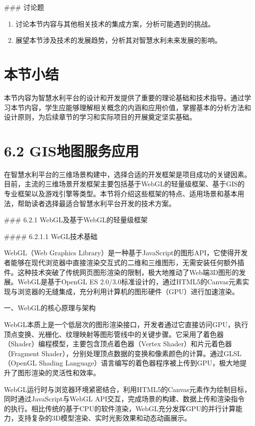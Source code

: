 \#\#\# 讨论题

\begin{enumerate}
\def\labelenumi{\arabic{enumi}.}
\setcounter{enumi}{6}
\tightlist
\item
  讨论本节内容与其他相关技术的集成方案，分析可能遇到的挑战。
\item
  展望本节涉及技术的发展趋势，分析其对智慧水利未来发展的影响。
\end{enumerate}

\section{本节小结}

本节内容为智慧水利平台的设计和开发提供了重要的理论基础和技术指导。通过学习本节内容，学生应能够理解相关概念的内涵和应用价值，掌握基本的分析方法和设计原则，为后续章节的学习和实际项目的开展奠定坚实基础。

\section{6.2 GIS地图服务应用}

在智慧水利平台的三维场景构建中，选择合适的开发框架是项目成功的关键因素。目前，主流的三维场景开发框架主要包括基于WebGL的轻量级框架、基于GIS的专业框架以及游戏引擎等类型。本节将介绍这些框架的特点、适用场景和基本用法，帮助读者选择最适合智慧水利平台开发的技术方案。

\#\#\# 6.2.1 WebGL及基于WebGL的轻量级框架

\#\#\#\# 6.2.1.1 WeGL技术基础

WebGL（Web Graphics Library）是一种基于JavaScript的图形API，它使得开发者能够在现代浏览器中直接渲染交互式的二维和三维图形，无需安装任何额外插件。这种技术突破了传统网页图形渲染的限制，极大地推动了Web端3D图形的发展。WebGL是基于OpenGL ES 2.0/3.0标准设计的，通过HTML5的Canvas元素实现与浏览器的无缝集成，充分利用计算机的图形硬件（GPU）进行加速渲染。

一、WebGL的核心原理与架构

WebGL本质上是一个低层次的图形渲染接口，开发者通过它直接访问GPU，执行顶点变换、光栅化、纹理映射等图形管线中的关键步骤。它采用了着色器（Shader）编程模型，主要包含顶点着色器（Vertex Shader）和片元着色器（Fragment Shader），分别处理顶点数据的变换和像素颜色的计算。通过GLSL（OpenGL Shading Language）语言编写的着色器程序被上传到GPU，极大地提升了图形渲染的灵活性和效率。

WebGL运行时与浏览器环境紧密结合，利用HTML5的Canvas元素作为绘制目标，同时通过JavaScript与WebGL API交互，完成场景的构建、数据上传和渲染指令的执行。相比传统的基于CPU的软件渲染，WebGL充分发挥GPU的并行计算能力，支持复杂的3D模型渲染、实时光影效果和动态动画展示。

